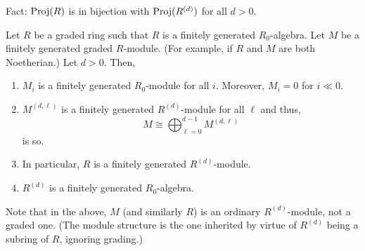 \documentclass[12pt]{article}
\begin{document}
Fact: $\operatorname{Proj}(R)$ is in bijection with $\operatorname{Proj}(R^{(d)})$ for all $d > 0$. 

\begin{prop} \label{prop:finite-module-over-graded-ring}
	Let $R$ be a graded ring such that $R$ is a finitely generated $R_{0}$-algebra. Let $M$ be a finitely generated graded $R$-module. (For example, if $R$ and $M$ are both Noetherian.) Let $d > 0$. \newline
	Then, 
	\begin{enumerate}[label=(\roman*)]
		\item $M_{i}$ is a finitely generated $R_{0}$-module for all $i$. Moreover, $M_{i} = 0$ for $i \ll 0$.
		\item $M^{(d, \ell)}$ is a finitely generated $R^{(d)}$-module for all $\ell$ and thus,
		\begin{equation*} 
			M \cong \bigoplus_{\ell = 0}^{d - 1} M^{(d, \ell)}
		\end{equation*}
		is so. 
		\item In particular, $R$ is a finitely generated $R^{(d)}$-module.
		\item $R^{(d)}$ is a finitely generated $R_{0}$-algebra.
	\end{enumerate}
\end{prop}
Note that in the above, $M$ (and similarly $R$) is an ordinary $R^{(d)}$-module, not a graded one. (The module structure is the one inherited by virtue of $R^{(d)}$ being a subring of $R$, ignoring grading.)
\end{document}

